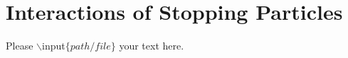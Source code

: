 \chapter{Interactions of Stopping Particles}

Please $\backslash$input$\{path/file\}$ your text here.

%
%




